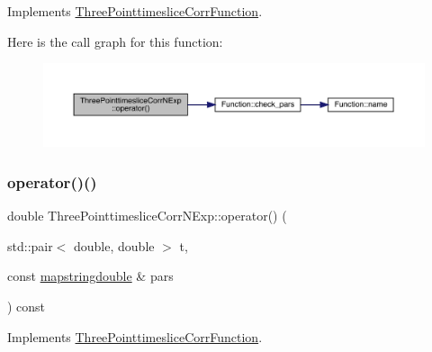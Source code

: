 Implements \mbox{\hyperlink{classThreePointtimesliceCorrFunction_af4198f5c0d9085c5dcc8d79447d54348}{Three\+Pointtimeslice\+Corr\+Function}}.

Here is the call graph for this function\+:
\nopagebreak
\begin{figure}[H]
\begin{center}
\leavevmode
\includegraphics[width=350pt]{d8/d1b/classThreePointtimesliceCorrNExp_a4d3143ae44c362e4dae6221ace8f1c02_cgraph}
\end{center}
\end{figure}
\mbox{\label{classThreePointtimesliceCorrNExp_a32c3a96362aae58e8eb5a5eb8f5aafc9}} 
\subsubsection{\texorpdfstring{operator()()}{operator()()}\hspace{0.1cm}{\footnotesize\ttfamily [2/4]}}
{\footnotesize\ttfamily double Three\+Pointtimeslice\+Corr\+N\+Exp\+::operator() (\begin{DoxyParamCaption}\item[{std\+::pair$<$ double, double $>$}]{t,  }\item[{const \mbox{\hyperlink{lib_2fitting__lib_2includes_8h_a647b481c557c7966517f753340a81d13}{mapstringdouble}} \&}]{pars }\end{DoxyParamCaption}) const\hspace{0.3cm}{\ttfamily [virtual]}}



Implements \mbox{\hyperlink{classThreePointtimesliceCorrFunction_a9d86382fdb47e87d53aea1878abd1da0}{Three\+Pointtimeslice\+Corr\+Function}}.

\mbox{\label{classThreePointtimesliceCorrNExp_a4d3143ae44c362e4dae6221ace8f1c02}} 
